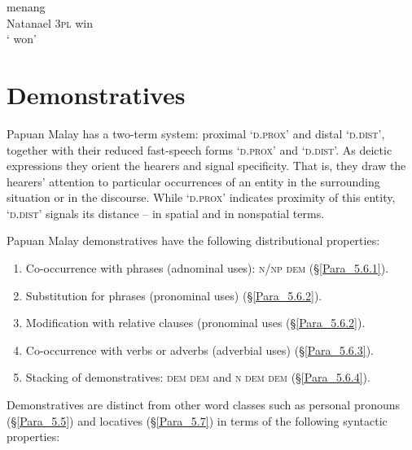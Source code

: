 \ea
\label{Example_5.202}
 {} {menang}\\ %
 Natanael  \textsc{3pl}  win\\
 ‘ won’ \textstyleExampleSource{[081109-001-Cv.0002]}
\z


\section{Demonstratives}
\label{Para_5.6}
Papuan Malay has a two-term  system: proximal  ‘\textsc{d.prox}’ and distal  ‘\textsc{d.dist}’, together with their reduced fast-speech forms  ‘\textsc{d.prox}’ and  ‘\textsc{d.dist}’. As deictic expressions they orient the hearers and signal specificity. That is, they draw the hearers’ attention to particular occurrences of an entity in the surrounding situation or in the discourse. While  ‘\textsc{d.prox}’ indicates proximity of this entity,  ‘\textsc{d.dist}’ signals its distance – in spatial and in nonspatial terms.



Papuan Malay demonstratives have the following distributional properties:


\begin{enumerate}
\item 
Co-occurrence with  phrases (adnominal uses): \textsc{n}/\textsc{np} \textsc{dem} (§\ref{Para_5.6.1}).

\item 
Substitution for  phrases (pronominal uses) (§\ref{Para_5.6.2}).

\item 
Modification with relative clauses (pronominal uses (§\ref{Para_5.6.2}).

\item 
Co-occurrence with verbs or adverbs (adverbial uses) (§\ref{Para_5.6.3}).

\item 
Stacking of demonstratives: \textsc{dem} \textsc{dem} and \textsc{n} \textsc{dem} \textsc{dem} (§\ref{Para_5.6.4}).

\end{enumerate}

Demonstratives are distinct from other word classes such as personal pronouns (§\ref{Para_5.5}) and locatives (§\ref{Para_5.7}) in terms of the following syntactic properties:


